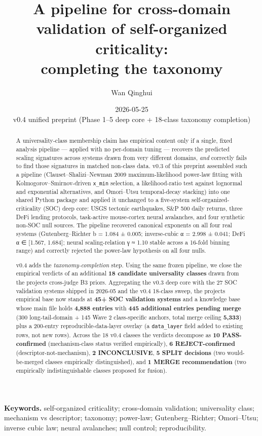 \documentclass[
  11pt]{article}
\title{A pipeline for cross-domain validation of self-organized criticality:\\
completing the taxonomy}
\author{Wan Qinghui}
\affil{Structural Isomorphism Project, Independent Researcher\\
\texttt{https://structural.bytedance.city}}
\date{2026-05-25 \\ \small v0.4 unified preprint (Phase 1--5 deep core + 18-class taxonomy completion)}
\begin{document}
\maketitle

\noindent\textbf{Keywords.} self-organized criticality; cross-domain validation;
universality class; mechanism vs descriptor; taxonomy; power-law;
Gutenberg--Richter; Omori--Utsu; inverse cubic law; neural avalanches;
null control; reproducibility.

\begin{abstract}

A universality-class membership claim has empirical content only if a
single, fixed analysis pipeline --- applied with no per-domain tuning
--- recovers the predicted scaling signatures across systems drawn from
very different domains, \emph{and} correctly fails to find those
signatures in matched non-class data. v0.3 of this preprint assembled
such a pipeline (Clauset--Shalizi--Newman 2009 maximum-likelihood
power-law fitting with Kolmogorov--Smirnov-driven \texttt{x\_min}
selection, a likelihood-ratio test against lognormal and exponential
alternatives, and Omori--Utsu temporal-decay stacking) into one shared
Python package and applied it unchanged to a five-system
self-organized-criticality (SOC) deep core: USGS tectonic earthquakes,
S\&P 500 daily returns, three DeFi lending protocols, task-active
mouse-cortex neural avalanches, and four synthetic non-SOC null
sources. The pipeline recovered canonical exponents on all four real
systems (Gutenberg--Richter b = 1.084 ± 0.005; inverse-cubic α = 2.998 ±
0.041; DeFi α ∈ {[}1.567, 1.684{]}; neural scaling-relation γ ≈ 1.10
stable across a 16-fold binning range) and correctly rejected the
power-law hypothesis on all four nulls.

v0.4 adds the \emph{taxonomy-completion} step. Using the same frozen
pipeline, we close the empirical verdicts of an additional
\textbf{18 candidate universality classes} drawn from the
project\textquotesingle s cross-judge B3 priors. Aggregating the v0.3
deep core with the 27 SOC validation systems shipped in 2026-05 and the
v0.4 18-class sweep, the project\textquotesingle s empirical base now
stands at \textbf{45+ SOC validation systems} and a knowledge base whose
main file holds \textbf{4,888 entries} with \textbf{445 additional
entries pending merge} (300 long-tail-domain + 145 Wave 2 class-specific
anchors, total merge ceiling \textbf{5,333}) plus a 200-entry
reproducible-data-layer overlay (a \texttt{data\_layer} field added to
existing rows, not new rows). Across the 18 v0.4 classes the verdicts
decompose as \textbf{10 PASS-confirmed} (mechanism-class status verified
empirically), \textbf{6 REJECT-confirmed} (descriptor-not-mechanism),
\textbf{2 INCONCLUSIVE}, \textbf{5 SPLIT decisions} (two would-be-merged
classes empirically distinguished), and \textbf{1 MERGE recommendation}
(two empirically indistinguishable classes proposed for fusion).


\end{abstract}
\end{document}
